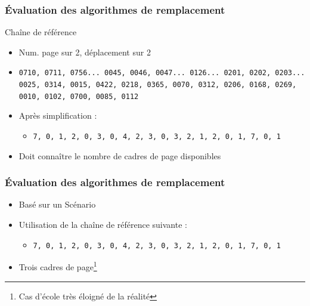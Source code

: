 \begin{frame}
\frametitle{Évaluation des algorithmes de remplacement}
\begin{exampleblock}{Chaîne de référence}
\begin{itemize}
\item Num. page sur 2, déplacement sur 2
\item \texttt{0710, 0711, 0756... 0045, 0046, 0047... 0126... 0201, 0202, 0203... 0025, 0314, 0015, 0422, 0218, 0365, 0070, 0312, 0206, 0168, 0269, 0010, 0102, 0700, 0085, 0112}
\end{itemize}
\end{exampleblock}
\begin{itemize}
\item Après simplification :
\begin{itemize}
\item \texttt{7, 0, 1, 2, 0, 3, 0, 4, 2, 3, 0, 3, 2, 1, 2, 0, 1, 7, 0, 1}
\end{itemize}
\item Doit connaître le nombre de cadres de page disponibles
\end{itemize}
\end{frame}


\begin{frame}
\frametitle{Évaluation des algorithmes de remplacement}
\begin{itemize}
\item Basé sur un Scénario
\item Utilisation de la chaîne de référence suivante :
\begin{itemize}
\item \texttt{7, 0, 1, 2, 0, 3, 0, 4, 2, 3, 0, 3, 2, 1, 2, 0, 1, 7, 0, 1}
\end{itemize}
\item Trois cadres de page\footnote{Cas d'école très éloigné de la réalité}
\end{itemize}
\end{frame}


